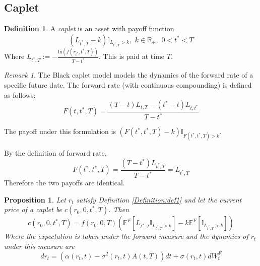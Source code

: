 \documentclass[12pt]{article}
\newtheorem{bond}{Proposition}
\theoremstyle{definition}
\newtheorem{mydef}{Definition}
\theoremstyle{remark}
\newtheorem{rem}{Remark}
\begin{document}
\subsection{Caplet}
\begin{mydef}
A \emph{caplet} is an asset with payoff function
\[(L_{{t^*}, T}-k)\mathbb{I}_{L_{{t^*}, T} > k},\,\,k \in \mathbb{R}_+,\,\,0 < {t^*} <T \]
Where \(L_{{t^*}, T} := -\frac{\mathrm{ln}(f(r_{{t^*}}, {t^*}, T))}{T-{t^*}}\).  This is paid at time \(T\).

\label{Definition:def2}
\end{mydef}
\begin{rem}

The Black caplet model models the dynamics of the forward rate of a specific future date. The forward rate (with continuous compounding) is defined as follows:
\[F(t, {t^*}, T)=\frac{(T-t) L_{t, T}-({t^*}-t) L_{t, {t^*}}}{T-{t^*}} \]

The payoff under this formulation is \((F({t^*}, {t^*}, T)-k)\mathbb{I}_{F({t^*}, {t^*}, T)>k} \).

By the definition of forward rate, 
\[F({t^*}, {t^*}, T)=\frac{(T-{t^*})L_{{t^*}, T}}{T-{t^*}}=L_{{t^*}, T} \]
Therefore the two payoffs are identical.
\label{Remark:rem1}
\end{rem}
\begin{bond}
Let \(r_t\) satisfy Definition \ref{Definition:def1} and let the current price of a caplet be \(c(r_0, 0, {t^*}, T)\). Then
\begin{equation}c(r_0, 0, {t^*}, T)=f(r_0, 0, T)\left(\mathbb{E}^{F} \left[L_{{t^*}, T} \mathbb{I}_{ L_{{t^*}, T}>k} \right] -k\mathbb{E}^{F} \left[\mathbb{I}_{L_{{t^*}, T} >k}\right]\right) \label{Equation:eq1}\end{equation} 
Where the expectation is taken under the forward measure and the dynamics of \(r_t\) under this measure are
\begin{equation}dr_t=\left(\alpha(r_t, t)-\sigma^2 (r_t, t)A(t, T)\right)dt+
\sigma(r_t, t) dW_t^F \label{Equation:eq2}\end{equation}
\label{Proposition:prop3}
\end{bond}
\end{document}
